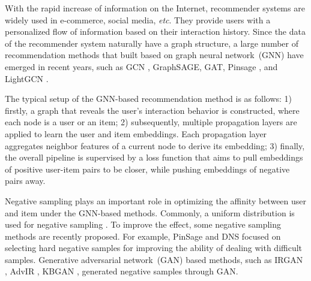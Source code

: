 With the rapid increase of information on the Internet, recommender systems are widely used in e-commerce, social media, \textit{etc}. They provide\textbf{} users with a personalized flow of information based on their interaction history. Since the data of the recommender system naturally have a graph structure\cite{wu2020gnnsurvey}, a large number of recommendation methods that built based on graph neural network~(GNN) have emerged in recent years, such as GCN \cite{gcn},  GraphSAGE\cite{graphsage}, GAT\cite{gat}, Pinsage \cite{pinsage}, and LightGCN \cite{he2020lightgcn}.

The typical setup of the GNN-based recommendation method is as follows: 
1) firstly, a graph that reveals the user's interaction behavior is constructed, where each node is a user or an item; 2) subsequently, multiple propagation layers are applied to learn the user and item embeddings. Each propagation layer aggregates neighbor features of a current node to derive its embedding; 3) finally, the overall pipeline is supervised by a loss function that aims to pull embeddings of positive user-item pairs to be closer, while pushing embeddings of negative pairs away.


Negative sampling plays an important role in optimizing the affinity between user and item under the GNN-based methods.
Commonly, a uniform distribution is used for negative sampling \cite{he2020lightgcn, rendle2012bpr}.
To improve the effect, some negative sampling methods are recently proposed.
For example, PinSage \cite{pinsage} and DNS \cite{dns} focused on selecting hard negative samples for improving the ability of dealing with difficult samples. 
Generative adversarial network~(GAN) based methods, such as IRGAN \cite{wang2017irgan}, AdvIR \cite{park2019adversarial}, KBGAN \cite{cai2017kbgan}, generated negative samples through GAN.



